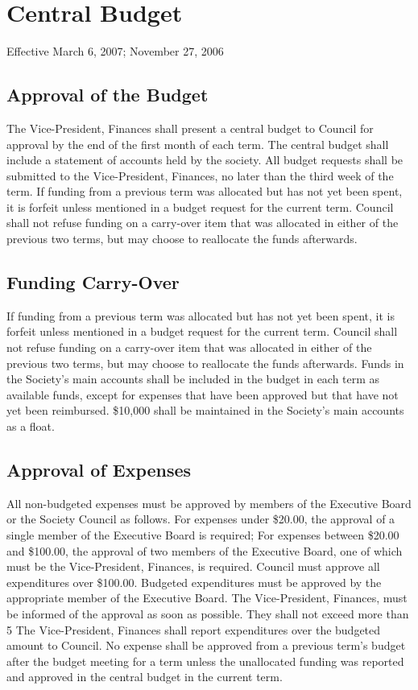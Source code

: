 \section{Central Budget}
Effective March 6, 2007; November 27, 2006

\subsection{Approval of the Budget}
The Vice-President, Finances shall present a central budget to Council for approval by the end of the first month of each term. The central budget shall include a statement of accounts held by the society.
All budget requests shall be submitted to the Vice-President, Finances, no later than the third week of the term.
If funding from a previous term was allocated but has not yet been spent, it is forfeit unless mentioned in a budget request for the current term. Council shall not refuse funding on a carry-over item that was allocated in either of the previous two terms, but may choose to reallocate the funds afterwards.

\subsection{Funding Carry-Over}
If funding from a previous term was allocated but has not yet been spent, it is forfeit unless mentioned in a budget request for the current term. Council shall not refuse funding on a carry-over item that was allocated in either of the previous two terms, but may choose to reallocate the funds afterwards.
Funds in the Society's main accounts shall be included in the budget in each term as available funds, except for expenses that have been approved but that have not yet been reimbursed.
\$10,000 shall be maintained in the Society's main accounts as a float.

\subsection{Approval of Expenses}
All non-budgeted expenses must be approved by members of the Executive Board or the Society Council as follows.
For expenses under \$20.00, the approval of a single member of the Executive Board is required;
For expenses between \$20.00 and \$100.00, the approval of two members of the Executive Board, one of which must be the Vice-President, Finances, is required.
Council must approve all expenditures over \$100.00.
Budgeted expenditures must be approved by the appropriate member of the Executive Board. The Vice-President, Finances, must be informed of the approval as soon as possible. They shall not exceed more than 5%
The Vice-President, Finances shall report expenditures over the budgeted amount to Council.
No expense shall be approved from a previous term's budget after the budget meeting for a term unless the unallocated funding was reported and approved in the central budget in the current term.

